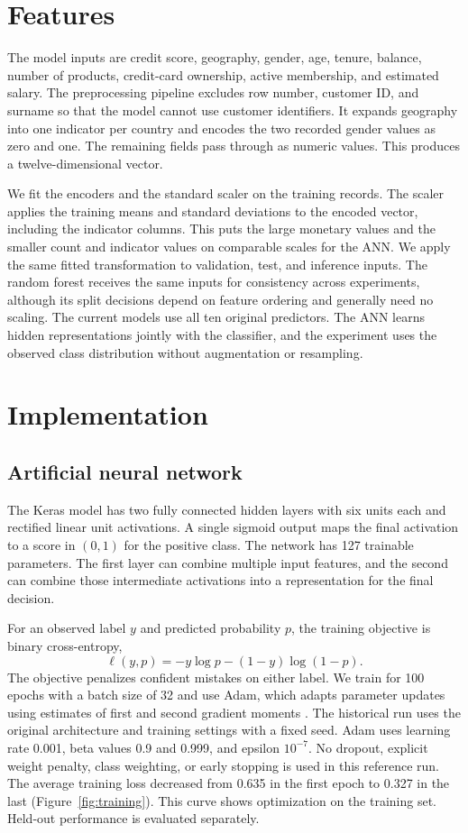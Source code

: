 \documentclass[11pt]{article}
\begin{document}
\section{Features}

The model inputs are credit score, geography, gender, age, tenure, balance, number of products, credit-card ownership, active membership, and estimated salary. The preprocessing pipeline excludes row number, customer ID, and surname so that the model cannot use customer identifiers. It expands geography into one indicator per country and encodes the two recorded gender values as zero and one. The remaining fields pass through as numeric values. This produces a twelve-dimensional vector.

We fit the encoders and the standard scaler on the training records. The scaler applies the training means and standard deviations to the encoded vector, including the indicator columns. This puts the large monetary values and the smaller count and indicator values on comparable scales for the ANN. We apply the same fitted transformation to validation, test, and inference inputs. The random forest receives the same inputs for consistency across experiments, although its split decisions depend on feature ordering and generally need no scaling. The current models use all ten original predictors. The ANN learns hidden representations jointly with the classifier, and the experiment uses the observed class distribution without augmentation or resampling.

\section{Implementation}

\subsection{Artificial neural network}

The Keras model has two fully connected hidden layers with six units each and rectified linear unit activations. A single sigmoid output maps the final activation to a score in $(0,1)$ for the positive class. The network has 127 trainable parameters. The first layer can combine multiple input features, and the second can combine those intermediate activations into a representation for the final decision.

For an observed label $y$ and predicted probability $p$, the training objective is binary cross-entropy,
\[
  \ell(y,p) = -y\log p - (1-y)\log(1-p).
\]
The objective penalizes confident mistakes on either label. We train for 100 epochs with a batch size of 32 and use Adam, which adapts parameter updates using estimates of first and second gradient moments \citep{kingma2015}. The historical run uses the original architecture and training settings with a fixed seed. Adam uses learning rate 0.001, beta values 0.9 and 0.999, and epsilon $10^{-7}$. No dropout, explicit weight penalty, class weighting, or early stopping is used in this reference run. The average training loss decreased from 0.635 in the first epoch to 0.327 in the last (Figure~\ref{fig:training}). This curve shows optimization on the training set. Held-out performance is evaluated separately.
\end{document}
